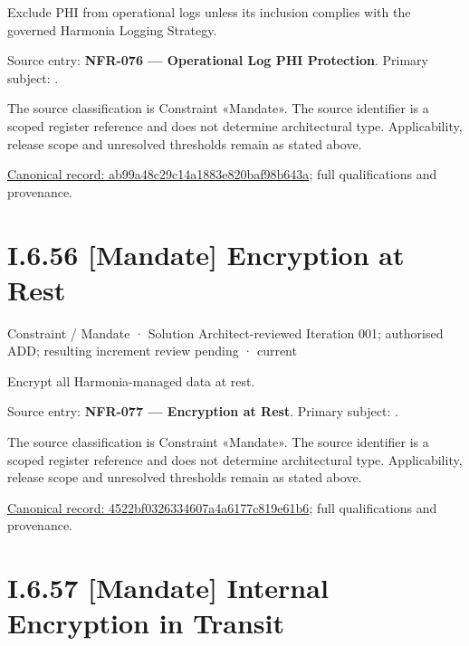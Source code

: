 Exclude PHI from operational logs unless its inclusion complies with the governed Harmonia Logging Strategy.



Source entry: \textbf{NFR-076 — Operational Log PHI Protection}. Primary subject: \texttt{}.



The source classification is Constraint «Mandate». The source identifier is a scoped register reference and does not determine architectural type. Applicability, release scope and unresolved thresholds remain as stated above.


{\footnotesize \href{../../../../../../../continuum/motivation/constraint/mandate/ab99a48c29c14a1883e820baf98b643a.md}{Canonical record: ab99a48c29c14a1883e820baf98b643a}; full qualifications and provenance.}\par
\section*{I.6.56 [Mandate] Encryption at Rest}
\label{navigation:I.6.56}

\label{element:4522bf0326334607a4a6177c819e61b6}
{\small Constraint / Mandate · Solution Architect-reviewed Iteration 001; authorised ADD; resulting increment review pending · current}\par

Encrypt all Harmonia-managed data at rest.



Source entry: \textbf{NFR-077 — Encryption at Rest}. Primary subject: \texttt{}.



The source classification is Constraint «Mandate». The source identifier is a scoped register reference and does not determine architectural type. Applicability, release scope and unresolved thresholds remain as stated above.


{\footnotesize \href{../../../../../../../continuum/motivation/constraint/mandate/4522bf0326334607a4a6177c819e61b6.md}{Canonical record: 4522bf0326334607a4a6177c819e61b6}; full qualifications and provenance.}\par
\section*{I.6.57 [Mandate] Internal Encryption in Transit}
\label{navigation:I.6.57}

